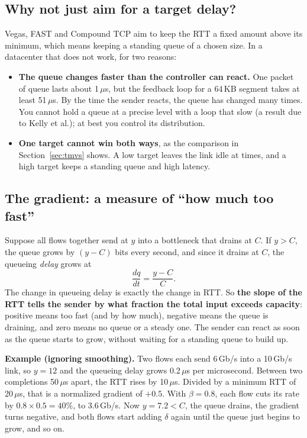 \subsection{Why not just aim for a target delay?}
Vegas, FAST and Compound TCP aim to keep the RTT a fixed amount above its minimum, which means keeping a standing queue of a chosen size.
In a datacenter that does not work, for two reasons:
\begin{itemize}
  \item \textbf{The queue changes faster than the controller can react.} One packet of queue lasts about 1\,$\mu$s, but the feedback loop for a
        64\,KB segment takes at least 51\,$\mu$s. By the time the sender reacts, the queue has changed many times. You cannot hold a queue at
        a precise level with a loop that slow (a result due to Kelly et al.); at best you control its distribution.
  \item \textbf{One target cannot win both ways}, as the comparison in Section~\ref{sec:tmvs} shows. A low target leaves the link idle at
        times, and a high target keeps a standing queue and high latency.
\end{itemize}

\subsection{The gradient: a measure of ``how much too fast''}
Suppose all flows together send at $y$ into a bottleneck that drains at $C$. If $y > C$, the queue grows by $(y - C)$ bits every second,
and since it drains at $C$, the queueing \emph{delay} grows at
\[
  \frac{dq}{dt} = \frac{y - C}{C}.
\]
The change in queueing delay is exactly the change in RTT. So \textbf{the slope of the RTT tells the sender by what fraction the total
input exceeds capacity}: positive means too fast (and by how much), negative means the queue is draining, and zero means no queue or a
steady one. The sender can react as soon as the queue starts to grow, without waiting for a standing queue to build up.

\textbf{Example (ignoring smoothing).} Two flows each send 6\,Gb/s into a 10\,Gb/s link, so $y = 12$ and the queueing delay grows 0.2\,$\mu$s
per microsecond. Between two completions 50\,$\mu$s apart, the RTT rises by 10\,$\mu$s. Divided by a minimum RTT of 20\,$\mu$s, that is a
normalized gradient of $+0.5$. With $\beta = 0.8$, each flow cuts its rate by $0.8 \times 0.5 = 40\%$, to 3.6\,Gb/s. Now $y = 7.2 < C$, the queue
drains, the gradient turns negative, and both flows start adding $\delta$ again until the queue just begins to grow, and so on.

